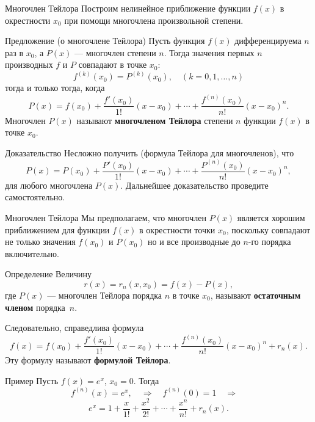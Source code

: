 \documentclass[8pt]{beamer}
\begin{document}
\begin{frame}{Многочлен Тейлора}
Построим нелинейное приближение функции $f(x)$ в окрестности $x_0$ при помощи многочлена произвольной степени. 

\begin{block}{Предложение (о многочлене Тейлора)}
Пусть функция $f(x)$ дифференцируема $n$ раз в $x_0$, а $P(x)$ --- многочлен степени $n$. Тогда значения первых $n$ производных $f$ и $P$ совпадают в точке $x_0$:
$$f^{(k)}(x_0) = P^{(k)}(x_0),\quad (k=0,1,\ldots,n)$$
тогда и только тогда, когда
$$P(x)  = f(x_0) + \frac{f'(x_0)}{1!}(x-x_0) + \cdots + \frac{f^{(n)}(x_0)}{n!}(x-x_0)^n.$$
Многочлен $P(x)$ называют {\bf многочленом Тейлора} степени $n$ функции $f(x)$ в точке $x_0$.
\end{block}
\begin{block}{Доказательство}
Несложно получить (формула Тейлора для многочленов), что
$$P(x) =  P(x_0) + \frac{P'(x_0)}{1!}(x-x_0) + \cdots + \frac{P^{(n)}(x_0)}{n!}(x-x_0)^n,$$
для любого многочлена $P(x)$. Дальнейшее доказательство проведите самостоятельно.
\end{block}
\end{frame}

\begin{frame}{Многочлен Тейлора}
Мы предполагаем, что многочлен $P(x)$ является хорошим приближением для функции $f(x)$ в окрестности точки $x_0$, поскольку совпадают не только значения $f(x_0)$ и $P(x_0)$ но и все производные до $n$-го порядка включительно. 
\begin{block}{Определение}
Величину
$$r(x) = r_n(x, x_0)  = f(x)  - P(x),$$
где $P(x)$ --- многочлен Тейлора порядка $n$ в точке $x_0$, называют {\bf остаточным членом} порядка~$n$.
\end{block}
Следовательно, справедлива формула
$$f(x) =  f(x_0) + \frac{f'(x_0)}{1!}(x-x_0) + \cdots + \frac{f^{(n)}(x_0)}{n!}(x-x_0)^n + r_n(x).$$
Эту формулу называют {\bf формулой Тейлора}.
\begin{block}{Пример}
Пусть $f(x) = e^x$, $x_0 = 0$. Тогда
$$f^{(n)}(x) = e^x,\quad \Rightarrow\quad f^{(n)}(0) = 1\quad \Rightarrow\quad$$
$$e^x  =1+ \frac{x}{1!} + \frac{x^2}{2!} + \cdots + \frac{x^n}{n!}+r_n(x).$$
\end{block}
\end{frame}
\end{document}
